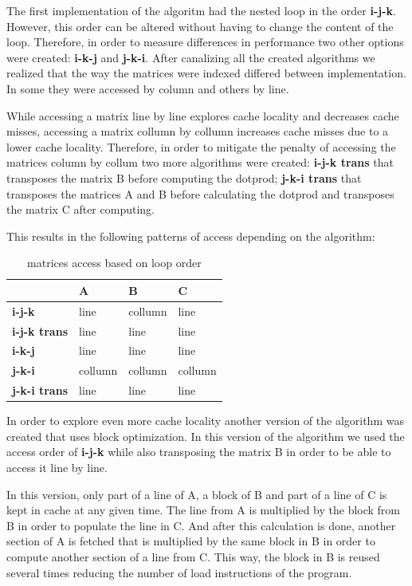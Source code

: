 \documentclass[a4paper]{report}
\begin{document}
The first implementation of the algoritm had the nested loop in the order
\textbf{i-j-k}. However, this order can be altered without having to change the
content of the loop. Therefore, in order to measure differences in performance
two other options were created: \textbf{i-k-j} and \textbf{j-k-i}. After
canalizing all the created algorithms we realized that the way the matrices were
indexed differed between implementation. In some they were accessed by column
and others by line.

While accessing a matrix line by line explores cache locality and decreases
cache misses, accessing a matrix collumn by collumn increases cache misses due
to a lower cache locality. Therefore, in order to mitigate the penalty of
accessing the matrices column by collum two more algorithms were created:
\textbf{i-j-k trans} that transposes the matrix B before computing the
dotprod; \textbf{j-k-i trans} that transposes the matrices A and B before
calculating the dotprod and transposes the matrix C after computing.

This results in the following patterns of access depending on the algorithm:

\begin{table}[H]
\centering
\begin{tabular}{|l|l|l|l|}
\hline
                     & A       & B       & C       \\ \hline
\textbf{i-j-k}       & line    & collumn & line    \\ \hline
\textbf{i-j-k trans} & line    & line    & line    \\ \hline
\textbf{i-k-j}       & line    & line    & line    \\ \hline
\textbf{j-k-i}       & collumn & collumn & collumn \\ \hline
\textbf{j-k-i trans} & line    & line    & line    \\ \hline
\end{tabular}
\caption{matrices access based on loop order}
\end{table}

In order to explore even more cache locality another version of the algorithm
was created that uses block optimization. In this version of the algorithm we
used the access order of \textbf{i-j-k} while also transposing the matrix B in
order to be able to access it line by line.

In this version, only part of a line of A, a block of B and part of a line of C
is kept in cache at any given time. The line from A is multiplied by the block
from B in order to populate the line in C. And after this calculation is done,
another section of A is fetched that is multiplied by the same block in B
in order to compute another section of a line from C. This way, the block in B
is reused several times reducing the number of load instructions of the program.
\end{document}
